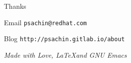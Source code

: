 \documentclass[10pt]{beamer}
\begin{document}
\begin{frame}[fragile,label={sec:org35122b0}]{Thanks}
 \begin{block}{Email}
\texttt{psachin@redhat.com}
\end{block}
\begin{block}{Blog}
\texttt{http://psachin.gitlab.io/about}
\end{block}


\begin{block}{}
\emph{Made with Love, \LaTeX and GNU Emacs}
\end{block}
\end{frame}
\end{document}
